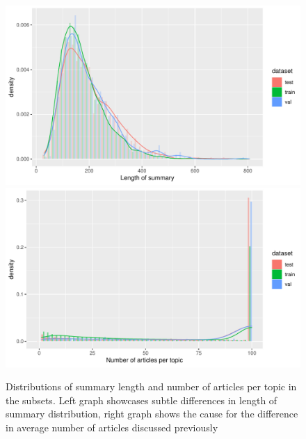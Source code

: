 \documentclass[../main.tex]{subfiles}
\begin{document}
\begin{figure}
    \includegraphics[width=.49\textwidth]{figures/Rplot01.pdf}
    \includegraphics[width=.49\textwidth]{figures/Rplot02.pdf}
    \caption{Distributions of summary length and number of articles per topic in the subsets. Left graph showcases subtle differences in length of summary distribution, right graph shows the cause for the difference in average number of articles discussed previously} \label{fig:analysis-distribution}
\end{figure}
\end{document}
